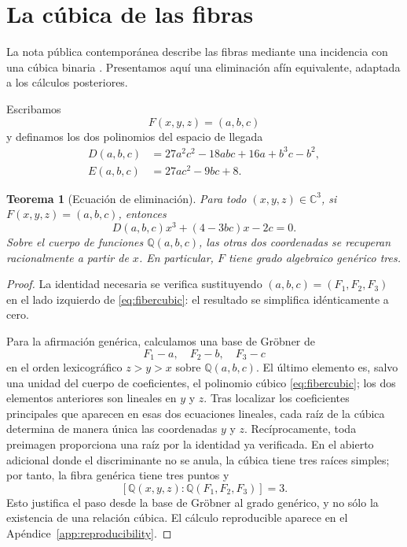\documentclass[11pt]{article}
\newtheorem{theorem}{Teorema}[section]
\theoremstyle{definition}
\theoremstyle{remark}
\newcommand{\C}{\mathbb{C}}
\newcommand{\Q}{\mathbb{Q}}
\begin{document}
\section{La c\'ubica de las fibras}

La nota p\'ublica contempor\'anea describe las fibras mediante una incidencia
con una c\'ubica binaria \cite{CounterexampleNote2026}. Presentamos aqu\'i una
eliminaci\'on af\'in equivalente, adaptada a los c\'alculos posteriores.

Escribamos
\[
F(x,y,z)=(a,b,c)
\]
y definamos los dos polinomios del espacio de llegada
\begin{align}
D(a,b,c)&=27a^2c^2-18abc+16a+b^3c-b^2,\label{eq:D}\\
E(a,b,c)&=27ac^2-9bc+8.\label{eq:E}
\end{align}

\begin{theorem}[Ecuaci\'on de eliminaci\'on]\label{thm:cubic}
Para todo $(x,y,z)\in\C^3$, si $F(x,y,z)=(a,b,c)$, entonces
\begin{equation}\label{eq:fibercubic}
D(a,b,c)x^3+(4-3bc)x-2c=0.
\end{equation}
Sobre el cuerpo de funciones $\Q(a,b,c)$, las otras dos coordenadas se
recuperan racionalmente a partir de $x$. En particular, $F$ tiene grado
algebraico gen\'erico tres.
\end{theorem}

\begin{proof}
La identidad necesaria se verifica sustituyendo
$(a,b,c)=(F_1,F_2,F_3)$ en el lado izquierdo de
\eqref{eq:fibercubic}: el resultado se simplifica id\'enticamente a cero.

Para la afirmaci\'on gen\'erica, calculamos una base de Gr\"obner de
\[
F_1-a,\quad F_2-b,\quad F_3-c
\]
en el orden lexicogr\'afico $z>y>x$ sobre $\Q(a,b,c)$. El \'ultimo elemento es,
salvo una unidad del cuerpo de coeficientes, el polinomio c\'ubico
\eqref{eq:fibercubic}; los dos elementos anteriores son lineales en $y$ y $z$.
Tras localizar los coeficientes principales que aparecen en esas dos
ecuaciones lineales, cada ra\'iz de la c\'ubica determina de manera \'unica las
coordenadas $y$ y $z$. Rec\'iprocamente, toda preimagen proporciona una ra\'iz
por la identidad ya verificada. En el abierto adicional donde el
discriminante no se anula, la c\'ubica tiene tres ra\'ices simples; por tanto,
la fibra gen\'erica tiene tres puntos y
\[
[\Q(x,y,z):\Q(F_1,F_2,F_3)]=3.
\]
Esto justifica el paso desde la base de Gr\"obner al grado gen\'erico, y no
s\'olo la existencia de una relaci\'on c\'ubica. El c\'alculo reproducible
aparece en el Ap\'endice~\ref{app:reproducibility}.
\end{proof}
\end{document}
